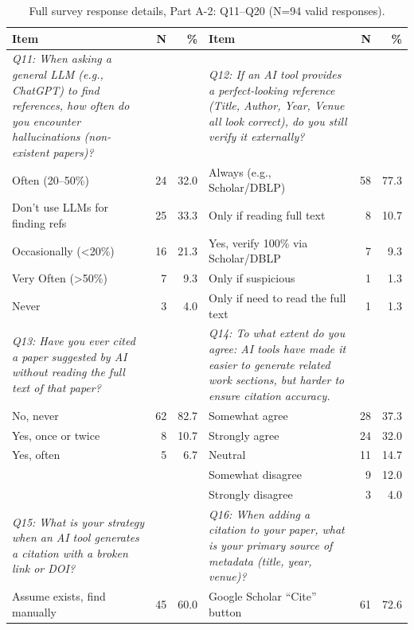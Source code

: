\begin{table}[htbp]
\centering
\caption{Full survey response details, Part A-2: Q11--Q20 (N=94 valid responses).}
\label{tab:survey_details_full_a2}
\small
\begin{tabular}{p{6cm}rr|p{6cm}rr}
\toprule
\textbf{Item} & \textbf{N} & \textbf{\%} & \textbf{Item} & \textbf{N} & \textbf{\%} \\
\midrule
\textit{Q11: When asking a general LLM (e.g., ChatGPT) to find references, how often do you encounter hallucinations (non-existent papers)?} & & & \textit{Q12: If an AI tool provides a perfect-looking reference (Title, Author, Year, Venue all look correct), do you still verify it externally?} & & \\
\rowcolor{tableRowLight}
Often (20--50\%) & 24 & 32.0 & Always (e.g., Scholar/DBLP) & 58 & 77.3 \\
Don't use LLMs for finding refs & 25 & 33.3 & Only if reading full text & 8 & 10.7 \\
\rowcolor{tableRowLight}
Occasionally (<20\%) & 16 & 21.3 & Yes, verify 100\% via Scholar/DBLP & 7 & 9.3 \\
Very Often (>50\%) & 7 & 9.3 & Only if suspicious & 1 & 1.3 \\
\rowcolor{tableRowLight}
Never & 3 & 4.0 & Only if need to read the full text & 1 & 1.3 \\
\midrule
\textit{Q13: Have you ever cited a paper suggested by AI without reading the full text of that paper?} & & & \textit{Q14: To what extent do you agree: AI tools have made it easier to generate related work sections, but harder to ensure citation accuracy.} & & \\
\rowcolor{tableRowLight}
No, never & 62 & 82.7 & Somewhat agree & 28 & 37.3 \\
Yes, once or twice & 8 & 10.7 & Strongly agree & 24 & 32.0 \\
\rowcolor{tableRowLight}
Yes, often & 5 & 6.7 & Neutral & 11 & 14.7 \\
 &  &  & Somewhat disagree & 9 & 12.0 \\
\rowcolor{tableRowLight}
 &  &  & Strongly disagree & 3 & 4.0 \\
\midrule
\textit{Q15: What is your strategy when an AI tool generates a citation with a broken link or DOI?} & & & \textit{Q16: When adding a citation to your paper, what is your primary source of metadata (title, year, venue)?} & & \\
\rowcolor{tableRowLight}
Assume exists, find manually & 45 & 60.0 & Google Scholar ``Cite'' button & 61 & 72.6 \\

\end{tabular}
\end{table}
